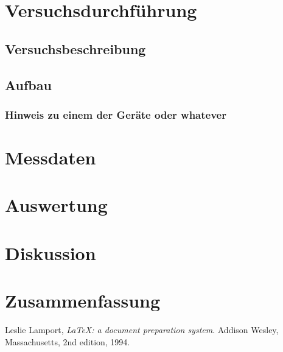 \documentclass[10pt, a4paper]{article}
\begin{document}
\section{Versuchsdurchführung}

\subsection{Versuchsbeschreibung}

\subsection{Aufbau}

\subsubsection{Hinweis zu einem der Geräte oder whatever}

\section{Messdaten}

\section{Auswertung}

\section{Diskussion}

\section{Zusammenfassung}


\begin{thebibliography}{9}

  Leslie Lamport,
  \emph{\LaTeX: a document preparation system}.
  Addison Wesley, Massachusetts,
  2nd edition,
  1994.
\end{thebibliography}

\newpage

\begin{appendix}

\end{appendix}
\end{document}

